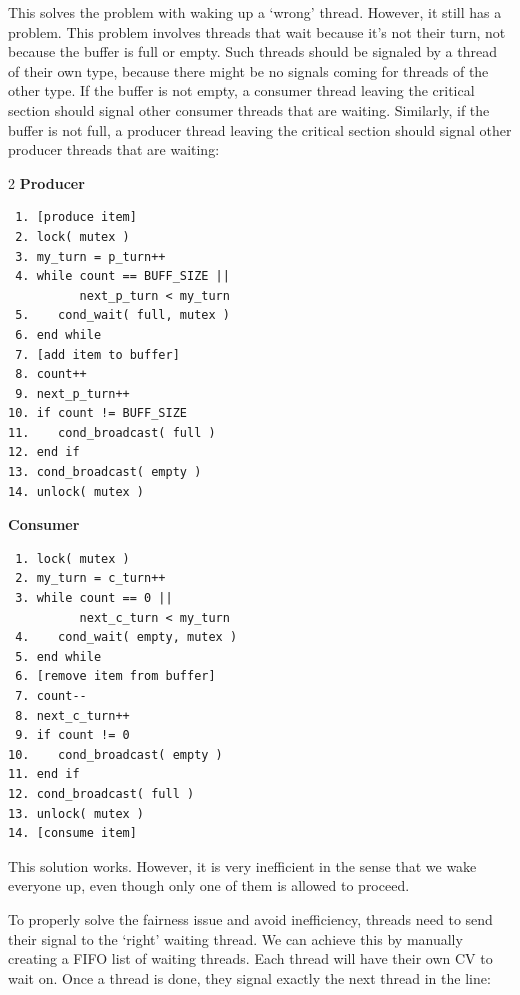 This solves the problem with waking up a `wrong' thread.
However, it still has a problem.
This problem involves threads that wait because it's not their turn, not because the buffer is full or empty.
Such threads should be signaled by a thread of their own type, because there might be no signals coming for threads of the other type.
If the buffer is not empty, a consumer thread leaving the critical section should signal other consumer threads that are waiting.
Similarly, if the buffer is not full, a producer thread leaving the critical section should signal other producer threads that are waiting:

\begin{multicols}{2}
    \small
    \textbf{Producer}\vspace{-2em}
    \begin{Verbatim}
 1. [produce item]
 2. lock( mutex )
 3. my_turn = p_turn++
 4. while count == BUFF_SIZE ||
          next_p_turn < my_turn
 5.    cond_wait( full, mutex )
 6. end while
 7. [add item to buffer]
 8. count++
 9. next_p_turn++
10. if count != BUFF_SIZE
11.    cond_broadcast( full )
12. end if
13. cond_broadcast( empty )
14. unlock( mutex )
    \end{Verbatim}
    \columnbreak
    \textbf{Consumer}\vspace{-2em}
    \begin{Verbatim}
 1. lock( mutex )
 2. my_turn = c_turn++
 3. while count == 0 ||
          next_c_turn < my_turn
 4.    cond_wait( empty, mutex )
 5. end while
 6. [remove item from buffer]
 7. count--
 8. next_c_turn++
 9. if count != 0
10.    cond_broadcast( empty )
11. end if
12. cond_broadcast( full )
13. unlock( mutex )
14. [consume item]
    \end{Verbatim}
\end{multicols}
\vspace{-2em}


This solution works.
However, it is very inefficient in the sense that we wake everyone up, even though only one of them is allowed to proceed.

To properly solve the fairness issue and avoid inefficiency, threads need to send their signal to the `right' waiting thread.
We can achieve this by manually creating a FIFO list of waiting threads.
Each thread will have their own CV to wait on.
Once a thread is done, they signal exactly the next thread in the line:


